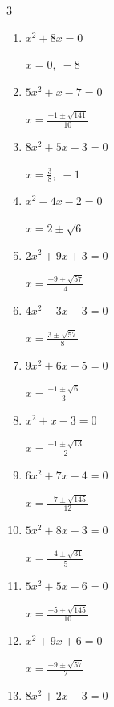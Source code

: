 \begin{multicols}{3}
\begin{enumerate}
        $\displaystyle x=1, \; -2$

  \item $x^{2}+8x=0$

        $\displaystyle x=0, \; -8$

  \item $5x^{2}+x-7=0$

        $\displaystyle x=\frac{-1\pm \sqrt{141}}{10}$

  \item $8x^{2}+5x-3=0$

        $\displaystyle x=\frac{3}{8}, \; -1$

  \item $x^{2}-4x-2=0$

        $\displaystyle x=2\pm \sqrt{6}$

\columnbreak %

\resetques

  \item $2x^{2}+9x+3=0$

        $\displaystyle x=\frac{-9\pm \sqrt{57}}{4}$

  \item $4x^{2}-3x-3=0$

        $\displaystyle x=\frac{3\pm \sqrt{57}}{8}$

  \item $9x^{2}+6x-5=0$

        $\displaystyle x=\frac{-1\pm \sqrt{6}}{3}$

  \item $x^{2}+x-3=0$

        $\displaystyle x=\frac{-1\pm \sqrt{13}}{2}$

  \item $6x^{2}+7x-4=0$

        $\displaystyle x=\frac{-7\pm \sqrt{145}}{12}$

  \item $5x^{2}+8x-3=0$

        $\displaystyle x=\frac{-4\pm \sqrt{31}}{5}$

  \item $5x^{2}+5x-6=0$

        $\displaystyle x=\frac{-5\pm \sqrt{145}}{10}$

\columnbreak %

  \item $x^{2}+9x+6=0$

        $\displaystyle x=\frac{-9\pm \sqrt{57}}{2}$

  \item $8x^{2}+2x-3=0$


\end{enumerate}
\end{multicols}
